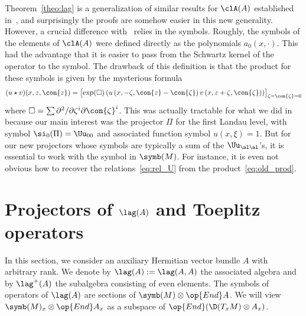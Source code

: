 Theorem~\ref{theo:lag} is a generalization of similar results for $\clA(A)$ established in~\cite{oim}, and surprisingly the proofs are somehow easier in this new generality. However, a crucial difference with~\cite{oim} relies in the symbols. Roughly, the symbols of the elements of $\clA(A)$ were defined directly as the polynomials $a_0 (x,\cdot)$. This had the advantage that it is easier to pass from the Schwartz kernel of the operator to the symbol. The drawback of this definition is that the product for these symbols is given by the mysterious formula
\begin{gather}\label{eq:old_prod}
(u \star v) (x, z, \con{z}) =\bigl[\exp (\Box) \left(u \left(x, - \zeta, \con{z} - \con {\zeta}\right) v \left(x, z+ \zeta, \con{\zeta}\right)\right)\bigr]_{\zeta = \con{\zeta} =0 }
\end{gather}
where $\Box = \sum \partial^2 / \partial \zeta^i \partial \con{\zeta}^i$. This was actually tractable for what we did in~\cite{oim} because our main interest was the projector $\Pi$ for the first Landau level, with symbol $\si_0(\Pi)=
\Uu_{00}$ and associated function symbol $u(x,\xi) =1$. But for our new projectors whose symbols are typically a sum of the $\Uu_{\al\al}$'s, it is essential to work with the symbol in $\symb (M)$. For instance, it is even not obvious how to recover the relations~\eqref{eq:rel_U} from the product~\eqref{eq:old_prod}.



\section{Projectors of \texorpdfstring{$\lag (A)$}{L(A)} and Toeplitz operators} \label{sec:projectors-Toeplitz}

In this section, we consider an auxiliary Hermitian vector bundle $A$ with arbitrary rank. We denote by $\lag (A): = \lag (A,A)$ the associated algebra and by $\lag^+(A)$ the subalgebra consisting of even elements. The symbols of operators of $\lag (A)$ are sections of $\symb (M) \otimes \op{End} A$. We will view $\symb (M)_x \otimes \op{End} A_x$ as a subspace of $\op{End} (\D (T_xM)
\otimes A_x)$.



